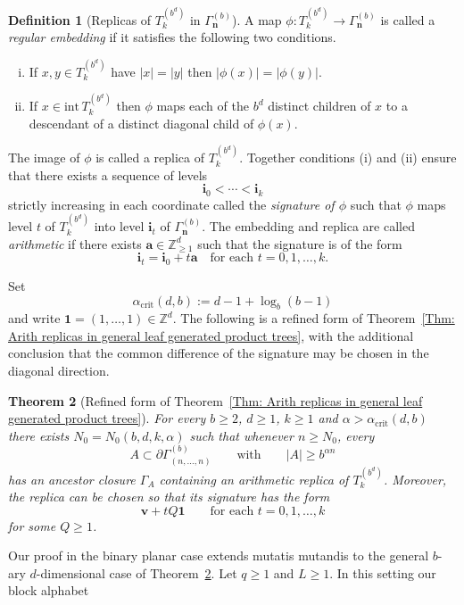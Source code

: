 \documentclass[11pt]{amsart}
\newcommand{\Z}{\mathbb{Z}}  %
\newcommand\labs[1]{\left\lvert#1\right\rvert}
\newcommand{\inte}{\mathrm{int}\,}
\renewcommand{\geq}{\geqslant}
\theoremstyle{plain}
\newtheorem{thm}{Theorem}[section]
\theoremstyle{definition}
\newtheorem{defn}[thm]{Definition}
\theoremstyle{remark}
\begin{document}
\begin{defn}[Replicas of $T_k^{\left(b^d\right)}$ in $\Gamma_{\mathbf{n}}^{(b)}$]
A map $\phi : T_k^{\left(b^d \right)} \to \Gamma_{\mathbf{n}}^{(b)}$ is called a \textit{regular embedding} if it satisfies the following two conditions.
\begin{enumerate}[(i)]
\item If $x,y\in T_k^{\left(b^d\right)}$ have $\labs{x} = \labs{y}$ then $\labs{\phi(x)} = \labs{\phi(y)}$.
\item If $x\in \inte T_k^{\left(b^d\right)}$ then $\phi$ maps each of the $b^d$ distinct children of $x$ to a descendant of a distinct diagonal child of $\phi(x)$.
\end{enumerate}
The image of $\phi$ is called a replica of $T_k^{\left(b^d\right)}$. Together conditions (i) and (ii) ensure that there exists a sequence of levels
\[ \mathbf{i}_0 < \cdots < \mathbf{i}_k\]
strictly increasing in each coordinate called the \textit{signature of $\phi$} such that $\phi$ maps level $t$ of $T_k^{\left(b^d\right)}$ into level $\mathbf{i}_t$ of $\Gamma_{\mathbf{n}}^{(b)}$. The embedding and replica are called \textit{arithmetic} if there exists $\mathbf{a}\in \Z^{d}_{\geq 1}$ such that the signature is of the form
\[ \mathbf{i}_t = \mathbf{i}_0 + t \mathbf{a} \quad \text{for each }t=0,1,\ldots,k.\] 
\end{defn}
Set
\[ \alpha_{\text{crit}}(d,b):= d-1 + \log_b(b-1)\]
and write $\mathbf{1} = (1,\ldots,1)\in \Z^d$. 
The following is a refined form of Theorem~\ref{Thm: Arith replicas in general leaf generated product trees}, with the additional conclusion that the common difference of the signature may be chosen in the diagonal direction.
\begin{thm}[Refined form of Theorem~\ref{Thm: Arith replicas in general leaf generated product trees}]\label{Thm: Main general theorem}
For every $b\geq 2$, $d\geq 1$, $k\geq 1$ and $\alpha > \alpha_{\text{crit}}(d,b)$ there exists $N_0 = N_0(b,d,k,\alpha)$ such that whenever $n\geq N_0$, every
\[ A\subset \partial \Gamma_{(n,\ldots,n)}^{(b)} \qquad \text{with} \qquad \labs{A}\geq b^{\alpha n} \]
has an ancestor closure $\Gamma_A$ containing an arithmetic replica of $T_k^{\left(b^d\right)}$. Moreover, the replica can be chosen so that its signature has the form
\[ \mathbf{v} + t Q \mathbf{1} \qquad \text{for each } t=0,1,\ldots,k\]
for some $Q\geq 1$.
\end{thm}
Our proof in the binary planar case extends mutatis mutandis to the general $b$-ary $d$-dimensional case of Theorem~\ref{Thm: Main general theorem}. Let $q\geq 1$ and $L\geq 1$. In this setting our block alphabet
\end{document}
